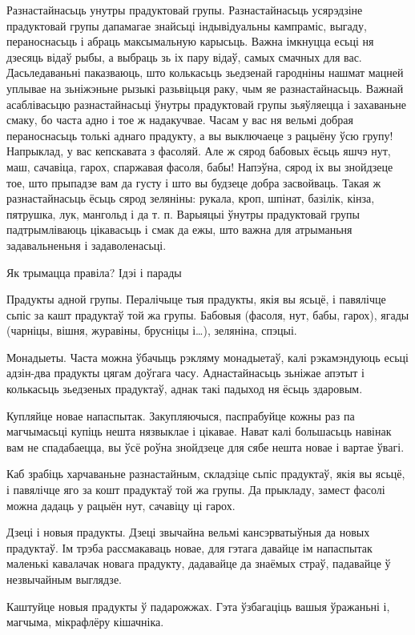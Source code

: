 Разнастайнасьць унутры прадуктовай групы.
Разнастайнасьць усярэдзіне прадуктовай групы дапамагае знайсьці індывідуальны кампраміс, выгаду, пераноснасьць і абраць максымальную карысьць. Важна імкнуцца есьці ня дзесяць відаў рыбы, а выбраць зь іх пару відаў, самых смачных для вас. Дасьледаваньні паказваюць, што колькасьць зьедзенай гародніны нашмат мацней уплывае на зьніжэньне рызыкі разьвіцьця раку, чым яе разнастайнасьць.
Важнай асаблівасьцю разнастайнасьці ўнутры прадуктовай групы зьяўляецца і захаваньне смаку, бо часта адно і тое ж надакучвае. Часам у вас ня вельмі добрая пераноснасьць толькі аднаго прадукту, а вы выключаеце з рацыёну ўсю групу! Напрыклад, у вас кепскавата з фасоляй. Але ж сярод бабовых ёсьць яшчэ нут, маш, сачавіца, гарох, спаржавая фасоля, бабы! Напэўна, сярод іх вы знойдзеце тое, што прыпадзе вам да густу і што вы будзеце добра засвойваць. Такая ж разнастайнасьць ёсьць сярод зеляніны: рукала, кроп, шпінат, базілік, кінза, пятрушка, лук, мангольд і да т. п. Варыяцыі ўнутры прадуктовай групы падтрымліваюць цікавасьць і смак да ежы, што важна для атрыманьня задавальненьня і задаволенасьці.

Як трымацца правіла? Ідэі і парады

Прадукты адной групы.
Пералічыце тыя прадукты, якія вы ясьцё, і павялічце сьпіс за кашт прадуктаў той жа групы. Бабовыя (фасоля, нут, бабы, гарох), ягады (чарніцы, вішня, журавіны, брусніцы і…), зеляніна, спэцыі.

Монадыеты.
Часта можна ўбачыць рэкляму монадыетаў, калі рэкамэндуюць есьці адзін-два прадукты цягам доўгага часу. Аднастайнасьць зьніжае апэтыт і колькасьць зьедзеных прадуктаў, аднак такі падыход ня ёсьць здаровым.

Купляйце новае напаспытак.
Закупляючыся, паспрабуйце кожны раз па магчымасьці купіць нешта нязвыклае і цікавае. Нават калі большасьць навінак вам не спадабаецца, вы ўсё роўна знойдзеце для сябе нешта новае і вартае ўвагі.

Каб зрабіць харчаваньне разнастайным, складзіце сьпіс прадуктаў, якія вы ясьцё, і павялічце яго за кошт прадуктаў той жа групы. Да прыкладу, замест фасолі можна дадаць у рацыён нут, сачавіцу ці гарох.

Дзеці і новыя прадукты.
Дзеці звычайна вельмі кансэрватыўныя да новых прадуктаў. Ім трэба рассмакаваць новае, для гэтага давайце ім напаспытак маленькі кавалачак новага прадукту, дадавайце да знаёмых страў, падавайце ў незвычайным выглядзе.

Каштуйце новыя прадукты ў падарожжах.
Гэта ўзбагаціць вашыя ўражаньні і, магчыма, мікрафлёру кішачніка.

